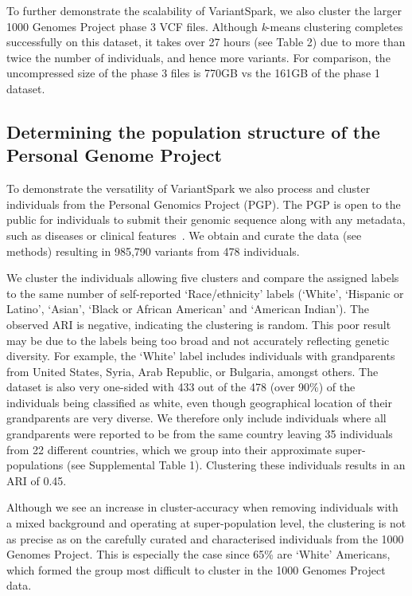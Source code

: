 \documentclass{bmcart}
\newcommand{\variantSpark}{{\sc VariantSpark}}
\newcommand{\kMeans}{\textit{k}-means}
\begin{document}
To further demonstrate the scalability of \variantSpark{}, we also cluster the larger 1000 Genomes Project phase 3 VCF files. Although \kMeans{} clustering completes successfully on this dataset,
it takes over 27 hours (see Table 2) due to more than twice the number of individuals, and hence more variants. For comparison, the uncompressed size of the phase 3 files is 770GB vs the 161GB of the phase 1 dataset.

\subsection*{Determining the population structure of the Personal Genome Project}
To demonstrate the versatility of \variantSpark{} we also process and cluster individuals from the Personal Genomics Project (PGP). The PGP is open to the public for individuals to submit their genomic sequence along with any metadata, such as diseases or clinical features~\cite{Lunshof2013}. 
We obtain and curate the data (see methods) resulting in 985,790 variants from 478 individuals.

We cluster the individuals allowing five clusters and compare the assigned labels to the same number of self-reported `Race/ethnicity' labels (`White', `Hispanic or Latino', `Asian', `Black or African American' and `American Indian').
The observed ARI is negative, indicating the clustering is random. 
This poor result may be due to the labels being too broad and not accurately reflecting genetic diversity. For example, the `White' label includes individuals with grandparents from United States, Syria, Arab Republic, or Bulgaria, amongst others. 
The dataset is also very one-sided with 433 out of the 478 (over 90\%) of the individuals being classified as white, even though geographical location of their grandparents are very diverse.
We therefore only include individuals where all grandparents were reported to be from the same country leaving 35 individuals from 22 different countries, which we group into their approximate super-populations (see Supplemental Table 1). 
Clustering these individuals results in an ARI of 0.45. 

Although we see an increase in cluster-accuracy when removing individuals with a mixed background and operating at super-population level, the clustering is not as precise as on the carefully curated and characterised individuals from the 1000 Genomes Project.
This is especially the case since 65\% are `White' Americans, which formed the group most difficult to cluster in the 1000 Genomes Project data.
\end{document}
